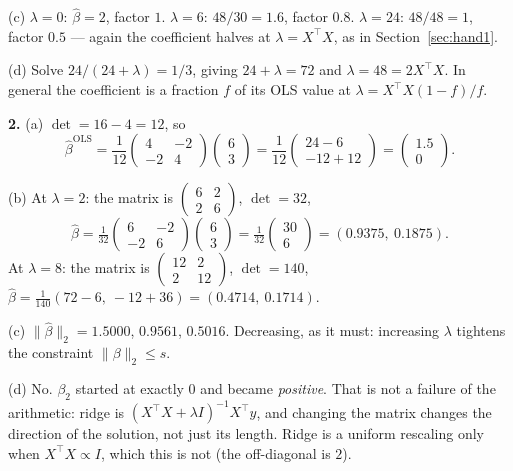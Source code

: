 \documentclass[11pt]{article}
\newcommand{\bhat}{\hat\beta}
\newcommand{\XtX}{X^{\!\top}\!X}
\newcommand{\Xty}{X^{\!\top}y}
\begin{document}
(c) $\lambda = 0$: $\bhat = 2$, factor $1$. $\lambda = 6$:
$48/30 = 1.6$, factor $0.8$. $\lambda = 24$: $48/48 = 1$, factor
$0.5$ --- again the coefficient halves at $\lambda = \XtX$, as in
Section~\ref{sec:hand1}.

(d) Solve $24/(24+\lambda) = 1/3$, giving $24 + \lambda = 72$ and
$\lambda = 48 = 2\XtX$. In general the coefficient is a fraction $f$ of its
OLS value at $\lambda = \XtX(1-f)/f$.

\medskip
\textbf{2.} (a) $\det = 16 - 4 = 12$, so
\[
  \bhat^{\mathrm{OLS}} = \frac{1}{12}
  \begin{pmatrix}4 & -2\\ -2 & 4\end{pmatrix}
  \begin{pmatrix}6\\3\end{pmatrix}
  = \frac{1}{12}\begin{pmatrix}24 - 6\\ -12 + 12\end{pmatrix}
  = \begin{pmatrix}1.5\\0\end{pmatrix}.
\]

(b) At $\lambda = 2$: the matrix is
$\left(\begin{smallmatrix}6&2\\2&6\end{smallmatrix}\right)$, $\det = 32$,
\[
  \bhat = \tfrac{1}{32}\begin{pmatrix}6&-2\\-2&6\end{pmatrix}
  \begin{pmatrix}6\\3\end{pmatrix}
  = \tfrac{1}{32}\begin{pmatrix}30\\6\end{pmatrix}
  = (0.9375,\ 0.1875).
\]
At $\lambda = 8$: the matrix is
$\left(\begin{smallmatrix}12&2\\2&12\end{smallmatrix}\right)$, $\det = 140$,
$\bhat = \tfrac{1}{140}(72 - 6,\ -12 + 36) = (0.4714,\ 0.1714)$.

(c) $\|\bhat\|_2 = 1.5000$, $0.9561$, $0.5016$. Decreasing, as it must:
increasing $\lambda$ tightens the constraint $\|\beta\|_2 \le s$.

(d) No. $\beta_2$ started at exactly $0$ and became \emph{positive}. That is
not a failure of the arithmetic: ridge is
$(\XtX+\lambda I)^{-1}\Xty$, and changing the matrix changes the direction of
the solution, not just its length. Ridge is a uniform rescaling only when
$\XtX \propto I$, which this is not (the off-diagonal is $2$).
\end{document}
